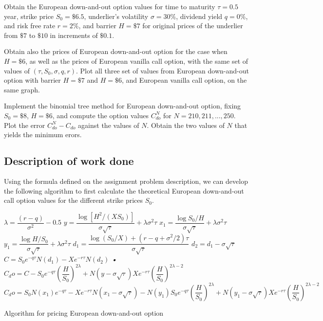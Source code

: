 Obtain the European down-and-out option values for time to maturity $\tau = 0.5$ year, strike price $S_0 = \$6.5$, underlier's volatility $\sigma = 30\%$, dividend yield $q = 0\%$, and risk free rate $r = 2\%$, and barrier $H = \$7$ for original prices of the underlier from $\$7$ to $\$10$ in increments of $\$0.1$. 

Obtain also the prices of European down-and-out option for the case when $H = \$6$, as well as the prices of European vanilla call option, with the same set of values of $(\tau, S_0, \sigma, q, r)$. Plot all three set of values from European down-and-out option with barrier $H = \$7$ and $H = \$6$, and European vanilla call option, on the same graph.

Implement the binomial tree method for European down-and-out option, fixing $S_0 = \$8$, $H = \$6$, and compute the option values $C_{do}^{N}$ for $N = 210, 211,...,250$. Plot the error $C^{N}_{do} - C_{do}$ against the values of $N$. Obtain the two values of $N$ that yields the minimum erors.

\subsection{Description of work done}
Using the formula defined on the assignment problem description, we can develop the following algorithm to first calculate the theoretical European down-and-out call option values for the different strike prices $S_0$.

\begin{algorithm}[H]
 \label{theoretical-do}
 $\lambda = \dfrac{(r - q)}{\sigma ^ 2}- 0.5$\;
 $y = \dfrac{\log{[H ^ 2/(XS_0)]}}{\sigma\sqrt{\tau}} + \lambda\sigma^2\tau$\;
 $x_1 =\dfrac{\log{S_0/H}}{\sigma\sqrt{\tau}} + \lambda\sigma^2\tau$\;
 $y_1 =\dfrac{\log{H/S_0}}{\sigma\sqrt{\tau}} + \lambda\sigma^2\tau$\;
 $d_1 =\dfrac{\log{(S_0/X)} + (r-q+\sigma^2 / 2)\tau}{\sigma\sqrt{\tau}}$\;
 $d_2 = d_1 - \sigma\sqrt{\tau}$\;
 $C = S_0e^{-q\tau}N(d_1) - X e^{-r\tau}N(d_2)$\;
  {\textsl{•}
    $C_do = C - S_0e^{-q\tau}\left(\dfrac{H}{S_0}\right)^{2\lambda}
      + N(y-\sigma\sqrt{\tau})Xe^{-r\tau}\left(\dfrac{H}{S_0}\right)^{2\lambda-2}$\;
  }{$C_do = S_0N(x_1)e^{-q\tau}
      - Xe^{-r\tau}N(x_1-\sigma\sqrt{\tau})
      - N(y_1)S_0e^{-q\tau}\left(\dfrac{H}{S_0}\right)^{2\lambda} 
      + N(y_1-\sigma\sqrt{\tau})Xe^{-r\tau}\left(\dfrac{H}{S_0}\right)^{2\lambda-2}$\;
  }
\caption{Algorithm for pricing European down-and-out option}
\end{algorithm}

